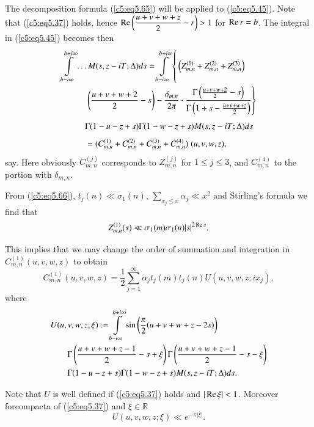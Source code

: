 The decomposition formula (\ref{c5:eq5.65}) will be applied to (\ref{c5:eq5.45}). Note that (\ref{c5:eq5.37}) holds, hence $\operatorname{Re} \left(\dfrac{u+v+w+z}{2}  -r\right) >1$ for $\operatorname{Re} r =b$. The integral in (\ref{c5:eq5.45}) becomes then 
\begin{align}
&\int\limits^{b+i\infty}_{b- i \infty} \ldots  M(s, z - iT;\Delta) ds
  =  
\int\limits^{b + i \infty}_{b -  i\infty}
\left\{\vphantom{\rule{0.1pt}{0.8cm}}\left(Z^{(1)}_{m,n} + 
Z^{(2)}_{m,n} + Z^{(3)}_{m,n}\right)\right.\notag\\ 
&\hspace{1cm}\left.\left( \frac{u+v+w+2}{2} -s\right) -
\frac{\delta_{m,n}}{2\pi} \cdot \frac{\Gamma \left(\frac{u+v+w+2}{2}
  -s\right)}{\Gamma\left(1+s- \frac{u+v+w+z}{2}\right)}
\right\}\notag\\[4pt]  
&\hspace{1cm}\Gamma (1-u -z+s) \Gamma (1-w-z+s) M(s,z-iT;\Delta)
ds\notag\\[4pt] 
&\hspace{1cm}= (C^{(1)}_{m,n} + C^{(2)}_{m,n} + C^{(3)}_{m,n} + C^{(4)}_{m,n} ) \;
(u,v,w,z),\label{c5:eq5.69} 
\end{align}
say. Here obviously $C^{(j)}_{m,n}$ corresponds to $Z^{(j)}_{m,n}$ for $1 \leq j \leq 3$, and $C^{(4)}_{m,n}$ to the portion with $\delta_{m,n}$. 

From (\ref{c5:eq5.66}), $t_j(n) \ll \sigma_1(n)$, $\sum\limits_{x_j
  \leq x} \alpha_j \ll x^2$ and Stirling's formula we find that 
$$
Z^{(1)}_{m,n} (s) \ll \sigma_1(m) \sigma_1(n) |s|^{2\operatorname{Re} s}. 
$$ 

This implies that we may change the order of summation and integration
in $C^{(1)}_{m,n} (u,v,w,z)$ to obtain 
\begin{equation}
C^{(1)}_{m,n} (u,v,w,z) = \frac{1}{2} \sum\limits^\infty_{j=1}
\alpha_j t_j(m) t_j(n) U (u,v,w,z;i x_j),\label{c5:eq5.70} 
\end{equation}
where
\begin{align}
& U(u,v,w,z;\xi) :  =
\int\limits^{b + i \infty}_{b - i \infty} \sin \left(\frac{\pi}{2}
(u+v+w+z-2s) \right)\label{c5:eq5.71}\\ 
& \qquad \Gamma \left(\frac{u+v+w+z-1}{2} - s + \xi \right)\Gamma
\left(\frac{u+v+w+z-1}{2} - s - \xi\right)\notag\\ 
& \qquad  \Gamma (1-u-z+s) \Gamma (1-w-z+s) M (s,z-iT;\Delta) ds.\notag
\end{align}

Note that $U$ is well defined if (\ref{c5:eq5.37}) holds and $|\operatorname{Re}
\xi| < 1$. Moreover for\pageoriginale compacta of (\ref{c5:eq5.37})
and $\xi \in \mathbb{R}$ 
\begin{equation}
U(u,v,w,z;\xi) \ll e^{-\pi |\xi|}.\label{c5:eq5.72}
\end{equation}

